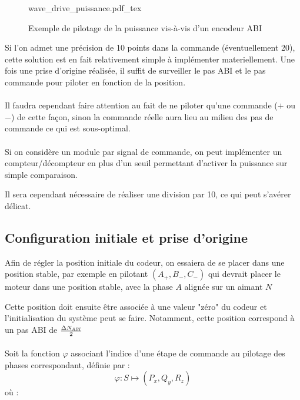 \begin{figure}[h]
    \centering
    \def\svgwidth{17cm}
    \small
    {wave_drive_puissance.pdf_tex}
    \caption{Exemple de pilotage de la puissance vis-à-vis d'un encodeur ABI}
    \label{fig:wave_drive_wrt_abi}
\end{figure}

Si l'on admet une précision de 10 points dans la commande (éventuellement 20), cette solution est en fait relativement simple à implémenter materiellement.
Une fois une prise d'origine réalisée, il suffit de surveiller le pas ABI et le pas commande pour piloter en fonction de la position.

\paragraph{}
Il faudra cependant faire attention au fait de ne piloter qu'une commande ($+$ ou $-$) de cette façon, sinon la commande réelle aura lieu au milieu des pas de commande ce qui est sous-optimal.

\paragraph{}
Si on considère un module par signal de commande, on peut implémenter un compteur/décompteur en plus d'un seuil permettant d'activer la puissance sur simple comparaison.

Il sera cependant nécessaire de réaliser une division par 10, ce qui peut s'avérer délicat.

\subsection{Configuration initiale et prise d'origine}
Afin de régler la position initiale du codeur, on essaiera de se placer dans une position stable, par exemple en pilotant $(A_+, B_-, C_-)$ qui devrait placer le moteur dans une position stable, avec la phase $A$ alignée sur un aimant $N$

Cette position doit ensuite être associée à une valeur "zéro" du codeur et l'initialisation du système peut se faire.
Notamment, cette position correspond à un pas ABI de $\frac{\Delta N_\mathit{ABI}}{2}$


\paragraph{}
Soit la fonction $\varphi$ associant l'indice d'une étape de commande au pilotage des phases correspondant, définie par  :
$$\varphi : S \longmapsto (P_x,Q_y,R_z)$$
où :

